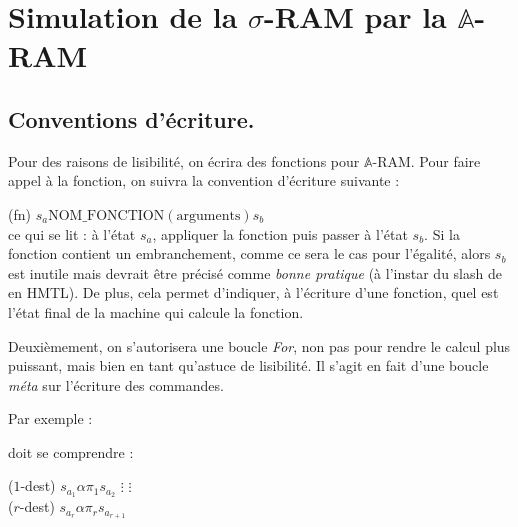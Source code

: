 \documentclass{report}
\newcommand{\bbA}{\mathbb{A}}
\begin{document}
		
			\begin{appendices}
				\label{appendices}
				
				\section{Simulation de la $\sigma$-RAM par la $\bbA$-RAM}
					\label{sec:annexes_programmes}
					
					\subsection{Conventions d'écriture.}
					\label{subsec:conventions_ecriture}
					Pour des raisons de lisibilité, on écrira des fonctions pour $\bbA$-RAM. Pour faire appel à la fonction, on suivra la convention d'écriture suivante : 
					
					(fn) 	$s_a \text{NOM\_FONCTION} (\text{arguments})s_b$\\
					ce qui se lit : à l'état $s_a$, appliquer la fonction puis passer à l'état $s_b$. Si la fonction contient un embranchement, comme ce sera le cas pour l'égalité, alors $s_b$ est inutile mais devrait être précisé comme \emph{bonne pratique} (à l'instar du slash de  en HMTL). De plus, cela permet d'indiquer, à l'écriture d'une fonction, quel est l'état final de la machine qui calcule la fonction.
					
					Deuxièmement, on s'autorisera une boucle \emph{For}, non pas pour rendre le calcul plus puissant, mais bien en tant qu'astuce de lisibilité. Il s'agit en fait d'une boucle \emph{méta} sur l'écriture des commandes.
					
					Par exemple :
					
					\espace
					
					\begin{algorithm}[H]
					\end{algorithm}
					
					\espace
					
					doit se comprendre :
					
					\espace
					
					\begin{algorithm}[H]
						($1$-dest) 	$s_{a_1} \alpha \pi_1 s_{a_{2}}$\;
						$\vdots$		\hspace{1cm} $\vdots$ \\
						($r$-dest) 	$s_{a_r} \alpha \pi_r s_{a_{r+1}}$\;
					\end{algorithm}
					

\end{appendices}
\end{document}
